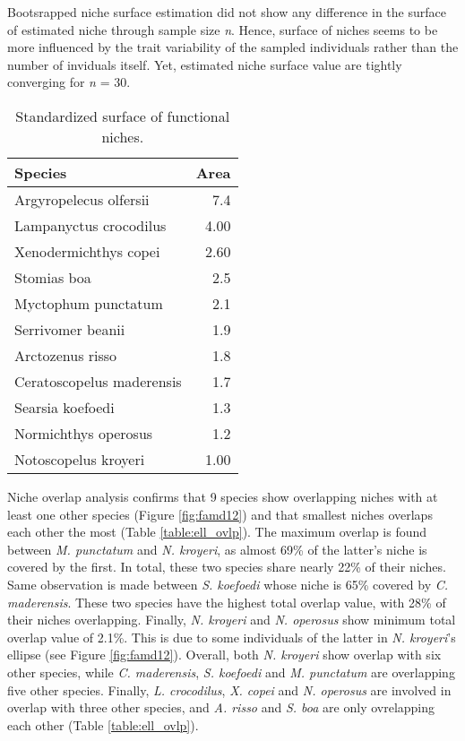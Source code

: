 Bootsrapped niche surface estimation did not show any difference in the surface of estimated niche through sample size \textit{n}. Hence, surface of niches seems to be more influenced by the trait variability of the sampled individuals rather than the number of inviduals itself. Yet, estimated niche surface value are tightly converging for \textit{n} = 30. 

\begin{table}[!htbp]
\centering
\caption[Standardized surface of functional niches]{Standardized surface of functional niches.}
\label{table:sp_surface}
\begin{adjustbox}{max width=1.1\textwidth,center}
\begin{tabular}{lr}
  \hline
Species & Area \\ 
  \hline
Argyropelecus olfersii & 7.4 \\ 
  Lampanyctus crocodilus & 4.00 \\ 
  Xenodermichthys copei & 2.60 \\ 
  Stomias boa & 2.5 \\ 
  Myctophum punctatum & 2.1 \\ 
  Serrivomer beanii & 1.9 \\ 
  Arctozenus risso & 1.8 \\ 
  Ceratoscopelus maderensis & 1.7 \\ 
  Searsia koefoedi & 1.3 \\ 
  Normichthys operosus & 1.2 \\ 
  Notoscopelus kroyeri & 1.00 \\ 
   \hline
\end{tabular}
\end{adjustbox}
\end{table}

Niche overlap analysis confirms that 9 species show overlapping niches with at least one other species (Figure \ref{fig:famd12}) and that smallest niches overlaps each other the most (Table \ref{table:ell_ovlp}). The maximum  overlap is found between \textit{M. punctatum} and \textit{N. kroyeri}, as almost 69\% of the latter's niche is covered by the first. In total, these two species share nearly 22\% of their niches. Same observation is made between \textit{S. koefoedi} whose niche is 65\% covered by \textit{C. maderensis}. These two species have the highest total overlap value, with 28\% of their niches overlapping. Finally, \textit{N. kroyeri} and \textit{N. operosus} show minimum total overlap value of 2.1\%. This is due to some individuals of the latter in \textit{N. kroyeri}'s ellipse (see Figure \ref{fig:famd12}). Overall, both \textit{N. kroyeri} show overlap with six other species, while \textit{C. maderensis}, \textit{S. koefoedi} and \textit{M. punctatum} are overlapping five other species. Finally, \textit{L. crocodilus}, \textit{X. copei} and \textit{N. operosus} are involved in overlap with three other species, and \textit{A. risso} and \textit{S. boa} are only ovrelapping each other (Table \ref{table:ell_ovlp}). 

